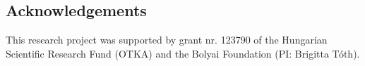 \documentclass[a0,portrait]{a0poster}
\begin{document}
\begin{multicols}{2}

\subsection*{Acknowledgements}
\tiny
This research project was supported by grant nr. 123790 of the Hungarian Scientific Research Fund (OTKA) and the Bolyai Foundation (PI: Brigitta Tóth).


\end{multicols}
\end{document}
